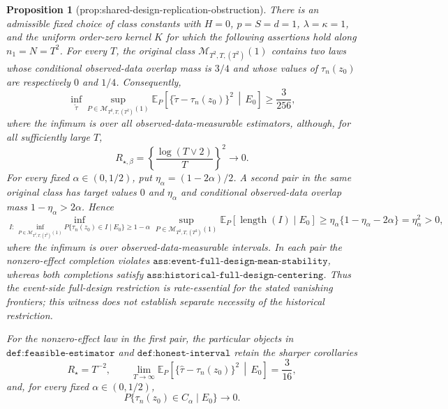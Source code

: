 \documentclass{article}
\newtheorem{proposition}{Proposition}
\begin{document}
\begin{proposition}[prop:shared-design-replication-obstruction]\label{prop:shared-design-replication-obstruction}
There is an admissible fixed choice of class constants with \(H=0\), \(p=S=d=1\), \(\lambda=\kappa=1\), and the uniform order-zero kernel \(K\) for which the following assertions hold along \(n_1=N=T^2\).  For every \(T\), the original class \(\mathcal M_{T^2,T,(T^2)}(1)\) contains two laws whose conditional observed-data overlap mass is \(3/4\) and whose values of \(\tau_n(z_0)\) are respectively \(0\) and \(1/4\).  Consequently,
\[
\inf_{\widetilde\tau}
\sup_{P\in\mathcal M_{T^2,T,(T^2)}(1)}
\mathbb E_P\!\left[
\{\widetilde\tau-\tau_n(z_0)\}^2\,\middle|\,E_0
\right]
\ge \frac{3}{256},
\]
where the infimum is over all observed-data-measurable estimators, although, for all sufficiently large \(T\),
\[
R_{\star,\beta}
=\left\{\frac{\log(T\vee2)}{T}\right\}^2\longrightarrow0.
\]
For every fixed \(\alpha\in(0,1/2)\), put \(\eta_\alpha=(1-2\alpha)/2\).  A second pair in the same original class has target values \(0\) and \(\eta_\alpha\) and conditional observed-data overlap mass \(1-\eta_\alpha>2\alpha\).  Hence
\[
\inf_{I:\,\inf_{P\in\mathcal M_{T^2,T,(T^2)}(1)}
P\{\tau_n(z_0)\in I\mid E_0\}\ge1-\alpha}
\sup_{P\in\mathcal M_{T^2,T,(T^2)}(1)}
\mathbb E_P[\operatorname{length}(I)\mid E_0]
\ge \eta_\alpha\{1-\eta_\alpha-2\alpha\}
=\eta_\alpha^2>0,
\]
where the infimum is over observed-data-measurable intervals.  In each pair the nonzero-effect completion violates \(\texttt{ass:event-full-design-mean-stability}\), whereas both completions satisfy \(\texttt{ass:historical-full-design-centering}\).  Thus the event-side full-design restriction is rate-essential for the stated vanishing frontiers; this witness does not establish separate necessity of the historical restriction.

For the nonzero-effect law in the first pair, the particular objects in \(\texttt{def:feasible-estimator}\) and \(\texttt{def:honest-interval}\) retain the sharper corollaries
\[
R_\star=T^{-2},
\qquad
\lim_{T\to\infty}\mathbb E_P\!\left[
\{\widehat\tau-\tau_n(z_0)\}^2\,\middle|\,E_0
\right]=\frac{3}{16},
\]
and, for every fixed \(\alpha\in(0,1/2)\),
\[
P\{\tau_n(z_0)\in C_\alpha\mid E_0\}\longrightarrow0.
\]
\end{proposition}
\end{document}
